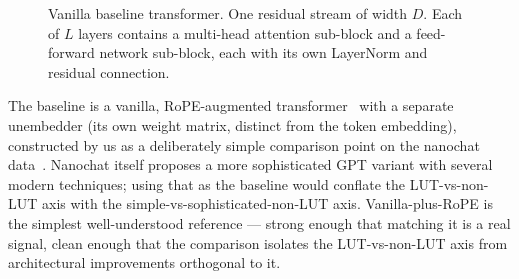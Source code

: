 \documentclass[11pt]{article}
\begin{document}
\begin{figure}[!ht]
{%
}%
\caption{Vanilla baseline transformer. One residual stream of width $D$. Each of $L$ layers contains a multi-head attention sub-block and a feed-forward network sub-block, each with its own LayerNorm and residual connection.}
\label{fig:vanilla}
\end{figure}

The baseline is a vanilla, RoPE-augmented transformer~\citep{vaswani2017attention,su2021roformer} with a separate unembedder (its own weight matrix, distinct from the token embedding), constructed by us as a deliberately simple comparison point on the nanochat data~\citep{karpathy_nanochat}. Nanochat itself proposes a more sophisticated GPT variant with several modern techniques; using that as the baseline would conflate the LUT-vs-non-LUT axis with the simple-vs-sophisticated-non-LUT axis. Vanilla-plus-RoPE is the simplest well-understood reference --- strong enough that matching it is a real signal, clean enough that the comparison isolates the LUT-vs-non-LUT axis from architectural improvements orthogonal to it.
\end{document}
